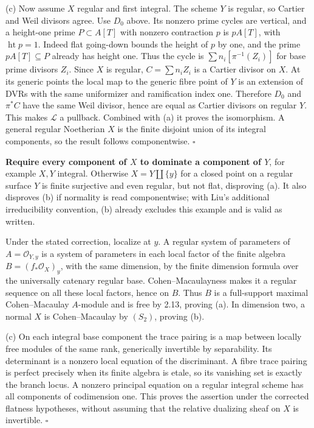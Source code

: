 \documentclass[11pt]{article}
\let\chapterexercise\exercise
\renewcommand{\exercise}[2]{\Needspace{8\baselineskip}\chapterexercise{#1}{#2}}
\begin{document}
(c) Now assume $X$ regular and first integral. The scheme $Y$ is regular, so Cartier and Weil divisors agree. Use $D_0$ above. Its nonzero prime cycles are vertical, and a height-one prime $P\subset A[T]$ with nonzero contraction $p$ is $pA[T]$, with $\operatorname{ht}p=1$. Indeed flat going-down bounds the height of $p$ by one, and the prime $pA[T]\subseteq P$ already has height one. Thus the cycle is $\sum n_i[\pi^{-1}(Z_i)]$ for base prime divisors $Z_i$. Since $X$ is regular, $C=\sum n_iZ_i$ is a Cartier divisor on $X$. At its generic points the local map to the generic fibre point of $Y$ is an extension of DVRs with the same uniformizer and ramification index one. Therefore $D_0$ and $\pi^*C$ have the same Weil divisor, hence are equal as Cartier divisors on regular $Y$. This makes $\mathcal L$ a pullback. Combined with (a) it proves the isomorphism. A general regular Noetherian $X$ is the finite disjoint union of its integral components, so the result follows componentwise. \hfill$\square$

\pf
\textbf{Require every component of $X$ to dominate a component of $Y$}, for example $X,Y$ integral. Otherwise $X=Y\amalg\{y\}$ for a closed point on a regular surface $Y$ is finite surjective and even regular, but not flat, disproving (a). It also disproves (b) if normality is read componentwise; with Liu's additional irreducibility convention, (b) already excludes this example and is valid as written.

Under the stated correction, localize at $y$. A regular system of parameters of $A=\mathcal O_{Y,y}$ is a system of parameters in each local factor of the finite algebra $B=(f_*\mathcal O_X)_y$, with the same dimension, by the finite dimension formula over the universally catenary regular base. Cohen--Macaulayness makes it a regular sequence on all these local factors, hence on $B$. Thus $B$ is a full-support maximal Cohen--Macaulay $A$-module and is free by 2.13, proving (a). In dimension two, a normal $X$ is Cohen--Macaulay by $(S_2)$, proving (b).

(c) On each integral base component the trace pairing is a map between locally free modules of the same rank, generically invertible by separability. Its determinant is a nonzero local equation of the discriminant. A fibre trace pairing is perfect precisely when its finite algebra is etale, so its vanishing set is exactly the branch locus. A nonzero principal equation on a regular integral scheme has all components of codimension one. This proves the assertion under the corrected flatness hypotheses, without assuming that the relative dualizing sheaf on $X$ is invertible. \hfill$\square$
\end{document}
